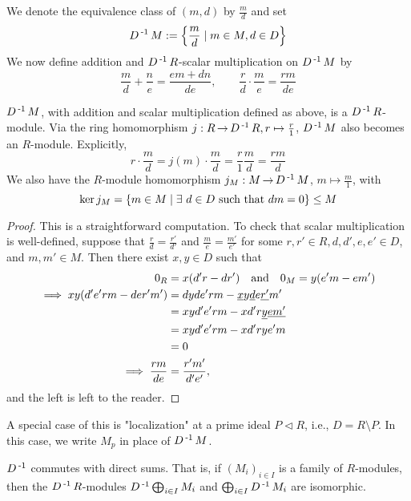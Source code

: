 \documentclass[11pt]{book}
\theoremstyle{definition}   \newtheorem{defn}[counter]{Definition} %
\newcommand{\bs}{\setminus}   \newcommand{\A}{\mathcal{A}}   \newcommand{\sy}{\textnormal{Syl}}   \newcommand{\size}[1]{\left| #1 \right|}
\DeclareMathOperator{\ra}{\rightarrow}   \DeclareMathOperator{\Poly}{\mathbf{P}}   \DeclareMathOperator{\spn}{\textnormal{span}}   \DeclareMathOperator{\aut}{\textnormal{Aut}}
\newcommand{\vs}{\vspace{8pt}}   \newcommand{\hs}{\hspace{8pt}}
\numberwithin{counter}{chapter}
\begin{document}
We denote the equivalence class of $(m,d)$ by $\frac{m}{d}$ and set
	\[ D\operatorname{^{-1}} M := \left\{\frac{m}{d} \mid m \in M, d \in D \right\} \]
We now define addition and $D\operatorname{^{-1}} R$-scalar multiplication on $D\operatorname{^{-1}} M$ by
	\[\frac{m}{d} + \frac{n}{e} = \frac{em + dn}{de}, \qquad \frac{r}{d} \cdot \frac{m}{e} = \frac{rm}{de} \]

\vs

\begin{lemma}
$D\operatorname{^{-1}} M$, with addition and scalar multiplication defined as above, is a $D\operatorname{^{-1}} R$-module. Via the ring homomorphism $j : R \ra D\inv R, r \mapsto \frac{r}{1}$, $D\operatorname{^{-1}} M$ also becomes an $R$-module. Explicitly,
	\[r \cdot \frac{m}{d} = j(m) \cdot \frac{m}{d} = \frac{r}{1} \frac{m}{d} = \frac{rm}{d} \]
We also have the $R$-module homomorphism $j_M : M \ra D\inv M$, $m \mapsto \frac{m}{1}$, with
	\[\ker j_M = \{m \in M \mid \exists \ d \in D \textnormal{ such that } dm = 0 \} \leq M \]
\end{lemma}

\begin{proof}
This is a straightforward computation. To check that scalar multiplication is well-defined, suppose that $\frac{r}{d} = \frac{r'}{d'}$ and $\frac{m}{e} = \frac{m'}{e'}$ for some $r,r' \in R, d,d',e,e' \in D$, and $m,m' \in M$. Then there exist $x,y \in D$ such that
\begin{align*}
0_R &= x(d'r-dr') \quad \textnormal{and} \quad 0_M = y(e'm-em') \\
\implies xy(d'e'rm - der'm') &= dyde'rm - \underline{x} y \underline{d} e \underline{r'} m' \\
&= xyd'e'rm - xd'r\underline{y} \underline{e} \underline{m'} \\
&= xyd'e'rm - xd'rye'm \\
&= 0 \\
\implies \frac{rm}{de} &= \frac{r'm'}{d'e'},
\end{align*}
and the left is left to the reader.
\end{proof}

\vs

A special case of this is "localization" at a prime ideal $P \vartriangleleft R$, i.e., $D = R \bs P$. In this case, we write $M_p$ in place of $D\operatorname{^{-1}} M$.

\vs

\begin{lemma}
$D\operatorname{^{-1}}$ commutes with direct sums. That is, if $(M_i)_{i \in I}$ is a family of $R$-modules, then the $D\operatorname{^{-1}} R$-modules $D\operatorname{^{-1}} \bigoplus_{i \in I} M_i$ and $\bigoplus_{i \in I} D\operatorname{^{-1}} M_i$ are isomorphic.
\end{lemma}
\end{document}
